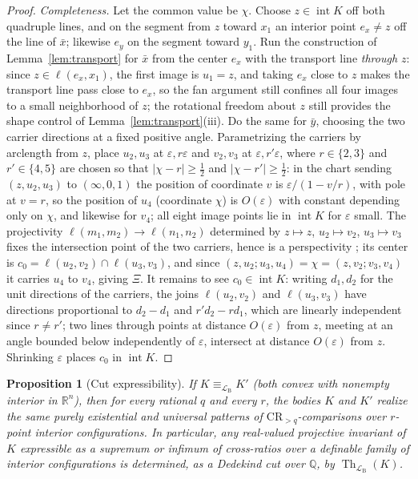 \documentclass[11pt]{amsart}
\newtheorem{proposition}[theorem]{Proposition}
\theoremstyle{definition}
\newcommand{\R}{\mathbb{R}}
\newcommand{\Q}{\mathbb{Q}}
\newcommand{\LB}{\mathcal{L}_{\mathrm{B}}}
\newcommand{\interior}{\operatorname{int}}
\newcommand{\Th}{\operatorname{Th}}
\begin{document}
\begin{proof}
\emph{Completeness.} Let the common value be $\chi$. Choose
$z\in\interior K$ off both quadruple lines, and on the segment from $z$
toward $x_1$ an interior point $e_x\ne z$ off the line of $\bar x$; likewise
$e_y$ on the segment toward $y_1$. Run the construction of
Lemma~\ref{lem:transport} for $\bar x$ from the center $e_x$ with the
transport line \emph{through $z$}: since $z\in\ell(e_x,x_1)$, the first image
is $u_1=z$, and taking $e_x$ close to $z$ makes the transport line pass close
to $e_x$, so the fan argument still confines all four images to a small
neighborhood of $z$; the rotational freedom about $z$ still provides the
shape control of Lemma~\ref{lem:transport}(iii). Do the same for $\bar y$,
choosing the two carrier directions at a fixed positive angle. Parametrizing
the carriers by arclength from $z$, place $u_2,u_3$ at $\varepsilon,r\varepsilon$
and $v_2,v_3$ at $\varepsilon,r'\varepsilon$, where $r\in\{2,3\}$ and
$r'\in\{4,5\}$ are chosen so that $|\chi-r|\ge\tfrac12$ and
$|\chi-r'|\ge\tfrac12$: in the chart sending $(z,u_2,u_3)$ to
$(\infty,0,1)$ the position of coordinate $v$ is
$\varepsilon/(1-v/r)$, with pole at $v=r$, so the position of
$u_4$ \textup(coordinate $\chi$\textup) is $O(\varepsilon)$ with constant
depending only on $\chi$, and likewise for $v_4$; all eight image points lie
in $\interior K$ for $\varepsilon$ small. The projectivity
$\ell(m_1,m_2)\to\ell(n_1,n_2)$ determined by $z\mapsto z$,
$u_2\mapsto v_2$, $u_3\mapsto v_3$ fixes the intersection point of the two
carriers, hence is a perspectivity \cite{Coxeter49}; its center is
$c_0=\ell(u_2,v_2)\cap\ell(u_3,v_3)$, and since
$(z,u_2;u_3,u_4)=\chi=(z,v_2;v_3,v_4)$ it carries $u_4$ to $v_4$, giving
$\Xi$. It remains to see $c_0\in\interior K$: writing $d_1,d_2$ for the unit
directions of the carriers, the joins $\ell(u_2,v_2)$ and $\ell(u_3,v_3)$
have directions proportional to $d_2-d_1$ and $r'd_2-rd_1$, which are
linearly independent since $r\ne r'$; two lines through points at distance
$O(\varepsilon)$ from $z$, meeting at an angle bounded below independently of
$\varepsilon$, intersect at distance $O(\varepsilon)$ from $z$. Shrinking
$\varepsilon$ places $c_0$ in $\interior K$.
\end{proof}

\begin{proposition}[Cut expressibility]
\label{prop:cuts}
If $K\equiv_{\LB}K'$ (both convex with
nonempty interior in $\R^n$), then for every rational $q$ and every $r$, the
bodies $K$ and $K'$ realize the same purely existential and universal
patterns of $\mathrm{CR}_{>q}$-comparisons over $r$-point interior
configurations. In particular, any real-valued projective invariant of $K$
expressible as a supremum or infimum of cross-ratios over a definable family
of interior configurations is determined, as a Dedekind cut over $\Q$, by
$\Th_{\LB}(K)$.
\end{proposition}
\end{document}
